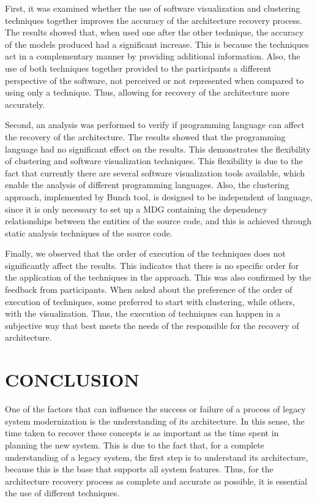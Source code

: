 \documentclass{sig-alternate-05-2015}
\begin{document}
First, it was examined whether the use of software visualization and clustering techniques together improves the accuracy of the architecture recovery process. The results showed that, when used one after the other technique, the accuracy of the models produced had a significant increase. This is because the techniques act in a complementary manner by providing additional information. Also, the use of both techniques together provided to the participants a different perspective of the software, not perceived or not represented when compared to using only a technique. Thus, allowing for recovery of the architecture more accurately. 

Second, an analysis was performed to verify if programming language can affect the recovery of the architecture. The results showed that the programming language had no significant effect on the results. This demonstrates the flexibility of clustering  and software visualization techniques. This flexibility is due to the fact that currently there are several software visualization tools available, which enable the analysis of different programming languages. Also, the clustering approach, implemented by Bunch tool, is designed to be independent of language, since it is only necessary to set up a MDG containing the dependency relationships between the entities of the source code, and this is achieved through static analysis techniques of the source code.

Finally, we observed that the order of execution of the techniques does not significantly affect the results. This indicates that there is no specific order for the application of the techniques in the approach. This was also confirmed by the feedback from participants. When asked about the preference of the order of execution of techniques, some preferred to start with clustering, while others, with the visualization. Thus, the execution of techniques can happen in a subjective way that best meets the needs of the responsible for the recovery of architecture.


\section{CONCLUSION}
One of the factors that can influence the success or failure of a process of legacy system modernization is the understanding of its architecture. In this sense, the time taken to recover these concepts is as important as the time spent in planning the new system. This is due to the fact that, for a complete understanding of a legacy system, the first step is to understand its architecture, because this is the base that supports all system features. Thus, for the architecture recovery process as complete and accurate as possible, it is essential the use of different techniques.
\end{document}
